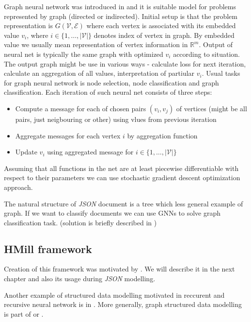 Graph neural network was introduced in \cite{Scarselli2009} and it is suitable model for problems represented by graph (directed or indirected). Initial setup is that the problem representation is $G(\mathcal{V},\mathcal{E})$ where each vertex is associated with its embedded value $v_i$, where $i\in\{1,\dots,|\mathcal{V}|\}$ denotes index of vertex in graph. By embedded value we usually mean representation of vertex information in $\mathbb{R}^m$. Output of neural net is typically the same graph with optimized $v_i$ according to situation. The output graph might be use in various ways - calculate loss for next iteration, calculate an aggregation of all values, interpretation of partiular $v_i$. Usual tasks for graph neural network is node selection, node classification and graph classification. Each iteration of such neural net consists of three steps:
\begin{itemize}
    \item Compute a message for each of chosen pairs $(v_i,v_j)$ of vertices (might be all pairs, just neigbouring or other) using vlues from previous iteration
    \item Aggregate messages for each vertex $i$ by aggregation function
    \item Update $v_i$ using aggregated message for $i\in\{1,\dots,|\mathcal{V}|\}$
\end{itemize}

Assuming that all functions in the net are at least piecewise differentiable with respect to their parameters we can use stochastic gradient descent optimization approach.

The natural structure of \emph{JSON} document is a tree which less general example of graph. If we want to classify documents we can use GNNs to solve graph classification task. (solution is briefly described in \cite{Pevny2020})

\subsection{HMill framework}
Creation of this framework was motivated by \cite{Pevny2016a}. We will describe it in the next chapter and also its usage during \emph{JSON} modelling.

Another example of structured data modelling motivated in reccurent and recursive neural network is in \cite{Woof2020}. More generally, graph structured data modelling is part of \cite{Henaff2015} or \cite{Borgwardt2005}.


